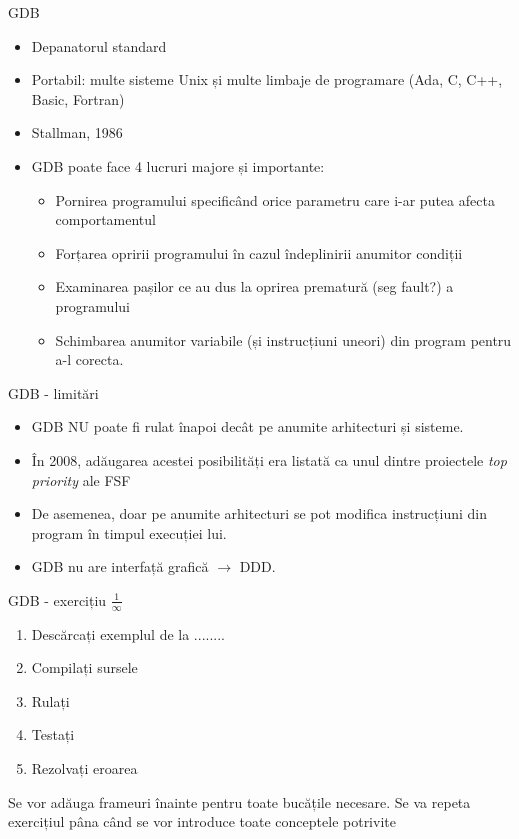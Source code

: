 \documentclass{beamer}
\begin{document}
\begin{frame}{GDB}
\begin{itemize}
\item Depanatorul standard
\item Portabil: multe sisteme Unix și multe limbaje de programare (Ada, C, C++, Basic, Fortran)
\item Stallman, 1986
\item \pause GDB poate face 4 lucruri majore și importante:
\begin{itemize}
\item \pause Pornirea programului specificând orice parametru care i-ar putea afecta comportamentul
\item \pause Forțarea opririi programului în cazul îndeplinirii anumitor condiții
\item \pause Examinarea pașilor ce au dus la oprirea prematură (seg fault?) a programului
\item \pause Schimbarea anumitor variabile (și instrucțiuni uneori) din program pentru a-l corecta.
\end{itemize}
\end{itemize}
\end{frame}

\begin{frame}{GDB - limitări}
\begin{itemize}
\item GDB NU poate fi rulat înapoi \pause decât pe anumite arhitecturi și sisteme.
\item \pause În 2008, adăugarea acestei posibilități era listată ca unul dintre proiectele \textit{top priority} ale FSF
\item \pause De asemenea, doar pe anumite arhitecturi se pot modifica instrucțiuni din program în timpul execuției lui.
\item \pause GDB nu are interfață grafică $\rightarrow$ DDD.
\end{itemize}
\end{frame}

\begin{frame}{GDB - exercițiu $\frac{1}{\infty}$}
\begin{enumerate}
\item Descărcați exemplul de la ........
\item Compilați sursele
\item Rulați
\item Testați
\item Rezolvați eroarea
\end{enumerate}
Se vor adăuga frameuri înainte pentru toate bucățile necesare. Se va repeta exercițiul pâna când se vor introduce toate conceptele potrivite
\end{frame}
\end{document}
